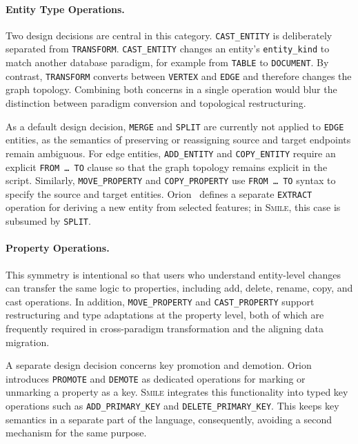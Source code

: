 \documentclass{llncs}
\begin{document}
\paragraph{Entity Type Operations.}
Two design decisions are central in this category.
\texttt{CAST\_ENTITY} is deliberately separated from \texttt{TRANSFORM}.
\texttt{CAST\_ENTITY} changes an entity's \texttt{entity\_kind} to match another database paradigm, for example from \texttt{TABLE} to \texttt{DOCUMENT}.
By contrast, \texttt{TRANSFORM} converts between \texttt{VERTEX} and \texttt{EDGE} and therefore changes the graph topology.
Combining both concerns in a single operation would blur the distinction between paradigm conversion and topological restructuring.

As a default design decision, \texttt{MERGE} and \texttt{SPLIT} are currently not applied to \texttt{EDGE} entities, as the semantics of preserving or reassigning source and target endpoints remain ambiguous.
For edge entities, \texttt{ADD\_ENTITY} and \texttt{COPY\_ENTITY} require an explicit \texttt{FROM \ldots\ TO} clause so that the graph topology remains explicit in the script. Similarly, \texttt{MOVE\_PROPERTY} and \texttt{COPY\_PROPERTY} use \texttt{FROM \ldots\ TO} syntax to specify the source and target entities.
Orion~\cite{chillon2022taxonomy} defines a separate \texttt{EXTRACT} operation for deriving a new entity from selected features; in \textsc{Smile}, this case is subsumed by \texttt{SPLIT}.


\paragraph{Property Operations.}
This symmetry is intentional so that users who understand entity-level changes can transfer the same logic to properties, including add, delete, rename, copy, and cast operations.
In addition, \texttt{MOVE\_PROPERTY} and \texttt{CAST\_PROPERTY} support restructuring and type adaptations at the property level, both of which are frequently required in cross-paradigm transformation and the aligning data migration.

A separate design decision concerns key promotion and demotion.
Orion~\cite{chillon2022taxonomy} introduces \texttt{PROMOTE} and \texttt{DEMOTE} as dedicated operations for marking or unmarking a property as a key.
\textsc{Smile} integrates this functionality into typed key operations such as \texttt{ADD\_PRIMARY\_KEY} and \texttt{DELETE\_PRIMARY\_KEY}.
This keeps key semantics in a separate part of the language, consequently, avoiding a second mechanism for the same purpose.
\end{document}
